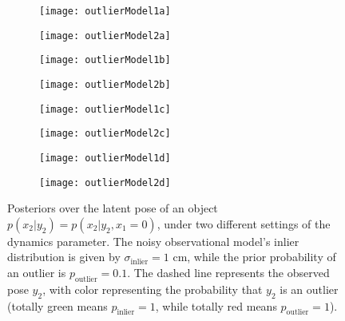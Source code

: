 \begin{figure}[H]
  \captionsetup[subfigure]{justification=centering}
  \begin{subfigure}[b]{0.5\textwidth}
    \centering
    \texttt{[image: outlierModel1a]}
  \end{subfigure}%
  \begin{subfigure}[b]{0.5\textwidth}
    \centering
    \texttt{[image: outlierModel2a]}
  \end{subfigure}
  \begin{subfigure}[b]{0.5\textwidth}
    \centering
    \texttt{[image: outlierModel1b]}
  \end{subfigure}%
  \begin{subfigure}[b]{0.5\textwidth}
    \centering
    \texttt{[image: outlierModel2b]}
  \end{subfigure}
  \begin{subfigure}[b]{0.5\textwidth}
    \centering
    \texttt{[image: outlierModel1c]}
  \end{subfigure}%
  \begin{subfigure}[b]{0.5\textwidth}
    \centering
    \texttt{[image: outlierModel2c]}
  \end{subfigure}
  \begin{subfigure}[b]{0.5\textwidth}
    \centering
    \texttt{[image: outlierModel1d]}
  \end{subfigure}%
  \begin{subfigure}[b]{0.5\textwidth}
    \centering
    \texttt{[image: outlierModel2d]}
  \end{subfigure}
  \caption{
    Posteriors over the latent pose of an object $p(x_2 | y_2) = p(x_2 | y_2, x_1 = 0)$, under two different settings of the dynamics parameter.
    The noisy observational model's inlier distribution is given by $\sigma_\mathrm{inlier} = 1$ cm, while the prior probability of an outlier is $p_\mathrm{outlier} = 0.1$.
    The dashed line represents the observed pose $y_2$, with color representing the probability that $y_2$ is an outlier (totally green means $p_\mathrm{inlier} = 1$, while totally red means $p_\mathrm{outlier} = 1$).
  }
  \label{fig:outlierModel}
\end{figure}


